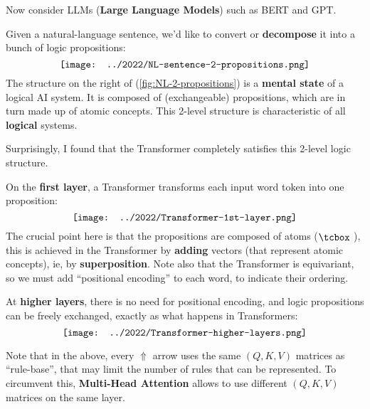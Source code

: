 \begin{preview}
\begin{minipage}{\textwidth}
Now consider LLMs (\textbf{Large Language Models}) such as BERT and GPT.

Given a natural-language sentence, we'd like to convert or \textbf{decompose} it into a bunch of logic propositions:
\begin{equation}
\label{fig:NL-2-propositions}
\vcenter{\hbox{\texttt{[image: ../2022/NL-sentence-2-propositions.png]}}}
\end{equation}
The structure on the right of (\ref{fig:NL-2-propositions}) is a \textbf{mental state} of a logical AI system.  It is composed of (exchangeable) propositions, which are in turn made up of atomic concepts.  This 2-level structure is characteristic of all \textbf{logical} systems.

Surprisingly, I found that the Transformer completely satisfies this 2-level logic structure.

On the \textbf{first layer}, a Transformer transforms each input word token into one proposition:
\begin{equation}
\vcenter{\hbox{\texttt{[image: ../2022/Transformer-1st-layer.png]}}}
\end{equation}
The crucial point here is that the propositions are composed of atoms ($\atom$), this is achieved in the Transformer by \textbf{adding} vectors (that represent atomic concepts), ie, by \textbf{superposition}.  Note also that the Transformer is equivariant, so we must add ``positional encoding'' to each word, to indicate their ordering.

At \textbf{higher layers}, there is no need for positional encoding, and logic propositions can be freely exchanged, exactly as what happens in Transformers:
\begin{equation}
\vcenter{\hbox{\texttt{[image: ../2022/Transformer-higher-layers.png]}}}
\end{equation}

Note that in the above, every $\Uparrow$ arrow uses the same $(Q,K,V)$ matrices as ``rule-base'', that may limit the number of rules that can be represented.  To circumvent this, \textbf{Multi-Head Attention} allows to use different $(Q,K,V)$ matrices on the same layer.

\end{minipage}
\end{preview}

\begin{comment}
\begin{preview}
\begin{minipage}{\textwidth}
\setlength{\parskip}{0.4\baselineskip}

\begin{textblock*}{20cm}(2.1cm,2cm) %
	{\color{red}{\large \textcircled{\small 2}}}
	\hspace{8cm}
	\color{blue}{\footnotesize \cc{逻辑 Transformer}{Logic Transformer}}
\end{textblock*}
\vspace*{0.3cm} 

\end{minipage}
\end{preview}
\end{comment}


